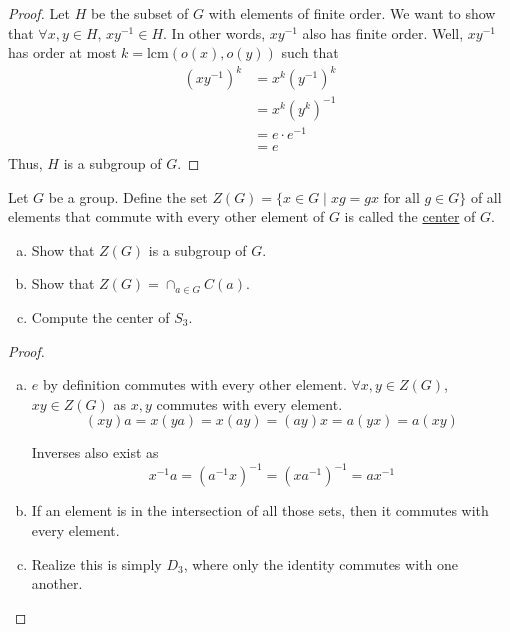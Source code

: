 \begin{proof}
Let $H$ be the subset of $G$ with elements of finite order. We want to show that $\forall x, y\in H$, $xy^{-1}\in H$. In other words, $xy^{-1}$ also has finite order. Well, $xy^{-1}$ has order at most $k=\mathrm{lcm}(o(x), o(y))$ such that 
\begin{align*}
	(xy^{-1})^k &= x^k (y^{-1})^k \\
	&= x^k (y^k)^{-1} \\
	&= e\cdot e^{-1} \\
	&= e
\end{align*}
Thus, $H$ is a subgroup of $G$. 
\end{proof}

Let $G$ be a group. Define the set $Z(G)=\{x\in G\mid xg=gx\text{ for all }g\in G\}$ of all elements that commute with every other element of $G$ is called the \ul{center} of $G$. 
\begin{enumerate}[(a)]
\item Show that $Z(G)$ is a subgroup of $G$. 
\item Show that $Z(G) = \cap_{a\in G}C(a)$. 
\item Compute the center of $S_3$. 
\end{enumerate}

\begin{proof}
\begin{enumerate}[(a)]
\item $e$ by definition commutes with every other element. $\forall x, y\in Z(G)$, $xy\in Z(G)$ as $x,y$ commutes with every element. 
\[(xy)a = x(ya) = x(ay) = (ay)x = a(yx) = a(xy)\]

Inverses also exist as
\[x^{-1}a = (a^{-1}x)^{-1} = (xa^{-1})^{-1} = ax^{-1}\]

\item If an element is in the intersection of all those sets, then it commutes with every element. 
\item Realize this is simply $D_3$, where only the identity commutes with one another. 
\end{enumerate}
	
\end{proof}


